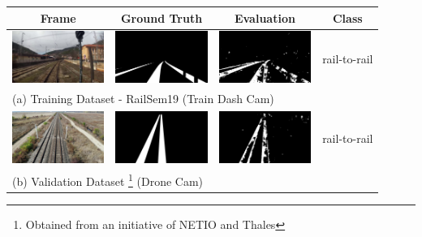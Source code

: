 \begin{table}
\begin{tabular}{cccc}
  Frame & Ground Truth & Evaluation & Class \\ \hline
  \includegraphics[width=30mm]{src/img/results-ml-0/par4/frame.jpg} & 
  \includegraphics[width=30mm]{src/img/results-ml-0/par4/seg.jpeg} & 
  \includegraphics[width=30mm]{src/img/results-ml-0/par4/det.jpg} &
  rail-to-rail \\
  \multicolumn{4}{l}{(a) Training Dataset - RailSem19\cite{zendel2019railsem19} (Train Dash Cam) } \\ \hline
  
  \includegraphics[width=30mm]{src/img/results-ml-0/par3/frame.jpg} & 
  \includegraphics[width=30mm]{src/img/results-ml-0/par3/seg.jpg} & 
  \includegraphics[width=30mm]{src/img/results-ml-0/par3/det.jpg} &
  rail-to-rail  \\
  \multicolumn{4}{l}{ (b) Validation Dataset \footnote{Obtained from an initiative of NETIO and Thales} (Drone Cam) } \\ \hline
  

\end{tabular}
\end{table}
